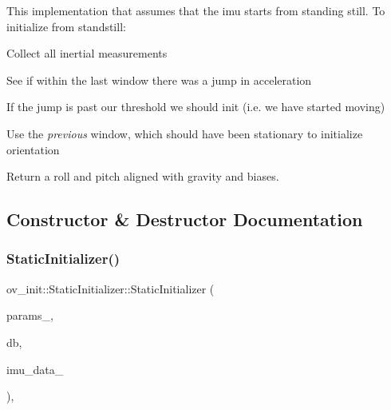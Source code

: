 This implementation that assumes that the imu starts from standing still. To initialize from standstill\+:
\begin{DoxyEnumerate}
\item Collect all inertial measurements
\item See if within the last window there was a jump in acceleration
\item If the jump is past our threshold we should init (i.\+e. we have started moving)
\item Use the {\itshape previous} window, which should have been stationary to initialize orientation
\item Return a roll and pitch aligned with gravity and biases. 
\end{DoxyEnumerate}

\subsection{Constructor \& Destructor Documentation}
\mbox{\label{classov__init_1_1StaticInitializer_a7c0e4dfac3e8d54a2303fe2cc3137026}} 
\subsubsection{\texorpdfstring{Static\+Initializer()}{StaticInitializer()}}
{\footnotesize\ttfamily ov\+\_\+init\+::\+Static\+Initializer\+::\+Static\+Initializer (\begin{DoxyParamCaption}\item[{\hyperlink{structov__init_1_1InertialInitializerOptions}{Inertial\+Initializer\+Options} \&}]{params\+\_\+,  }\item[{std\+::shared\+\_\+ptr$<$ \hyperlink{classov__core_1_1FeatureDatabase}{ov\+\_\+core\+::\+Feature\+Database} $>$}]{db,  }\item[{std\+::shared\+\_\+ptr$<$ std\+::vector$<$ \hyperlink{structov__core_1_1ImuData}{ov\+\_\+core\+::\+Imu\+Data} $>$$>$}]{imu\+\_\+data\+\_\+ }\end{DoxyParamCaption})\hspace{0.3cm}{\ttfamily [inline]}, {\ttfamily [explicit]}}




